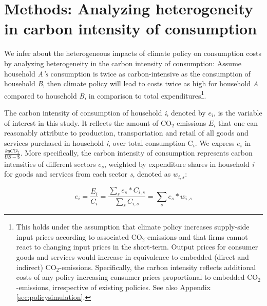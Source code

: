 \documentclass[12pt, a4paper]{article}
\begin{document}
\section{Methods: Analyzing heterogeneity in carbon intensity of consumption} \label{sec:methods}

We infer about the heterogeneous impacts of climate policy on consumption costs by analyzing heterogeneity in the carbon intensity of consumption: Assume household \textit{A's} consumption is twice as carbon-intensive as the consumption of household \textit{B}, then climate policy will lead to costs twice as high for household \textit{A} compared to household \textit{B}, in comparison to total expenditures\footnote{This holds under the assumption that climate policy increases supply-side input prices according to associated CO$_{2}$-emissions and that firms cannot react to changing input prices in the short-term. Output prices for consumer goods and services would increase in equivalence to embedded (direct and indirect) CO$_{2}$-emissions. Specifically, the carbon intensity reflects additional costs of any policy increasing consumer prices proportional to embedded CO$_{2}$-emissions, irrespective of existing policies. See also Appendix \ref{sec:policysimulation}.}.

The carbon intensity of consumption of household \textit{i}, denoted by $e_{i}$, is the variable of interest in this study. It reflects the amount of CO$_{2}$-emissions $E_{i}$ that one can reasonably attribute to production, transportation and retail of all goods and services purchased in household \textit{i}, over total consumption C$_{i}$. We express $e_{i}$ in $\frac{kgCO_{2}}{US-\$}$. More specifically, the carbon intensity of consumption represents carbon intensities of different sectors $e_{s}$, weighted by expenditure shares in household \textit{i} for goods and services from each sector \textit{s}, denoted as $w_{i,s}$:


\begin{equation} \label{eq:ei}
e_{i} = \frac{E_{i}}{C_{i}} = \frac{\sum_{s} e_{s}*C_{i,s}}{\sum_{s} C_{i,s}} = \sum_{s} e_{s}*w_{i,s}
\end{equation}

\end{document}
